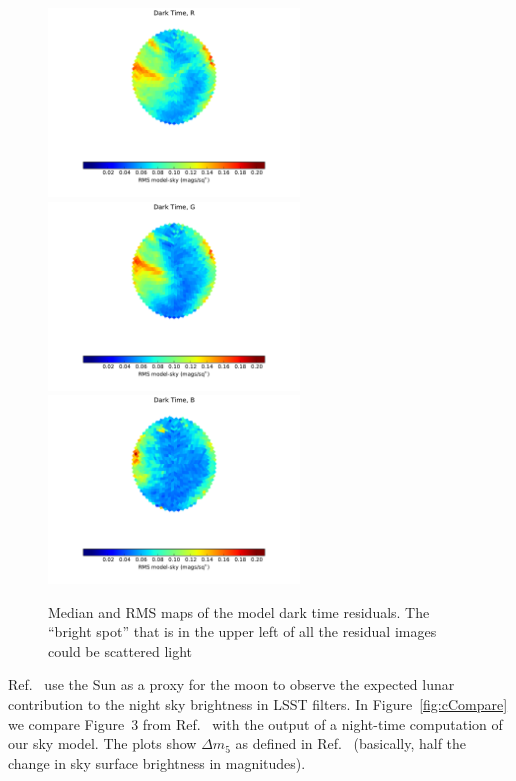 \documentclass[]{spie}
\begin{document}
\begin{figure}[ht]
\begin{center}
  \includegraphics[height=5cm]{plots/stdResidMap_R.pdf}\includegraphics[height=5cm]{plots/stdResidMap_g.pdf}\includegraphics[height=5cm]{plots/stdResidMap_b.pdf}
  \end{center}
  \caption{Median and RMS maps of the model dark time residuals. The ``bright spot'' that is in the upper left of all the residual images could be scattered light }
\end{figure}


Ref.~ use the Sun as a proxy for the moon to observe the expected lunar contribution to the night sky brightness in LSST filters. In Figure~\ref{fig:cCompare} we compare Figure~3 from Ref.~ with the output of a night-time computation of our sky model.  The plots show $\Delta m_5$ as defined in Ref.~ (basically, half the change in sky surface brightness in magnitudes).  
\end{document}
